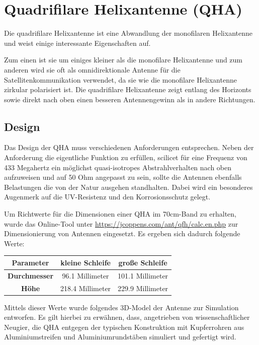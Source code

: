 \chapter{Quadrifilare Helixantenne (QHA)}
\label{chap:qfh}
Die quadrifilare Helixantenne ist eine Abwandlung der monofilaren Helixantenne und weist einige interessante Eigenschaften auf.

Zum einen ist sie um einiges kleiner als die monofilare Helixantenne und zum anderen wird sie oft als omnidirektionale Antenne für die Satellitenkommunikation verwendet, da sie wie die monofilare Helixantenne zirkular polarisiert ist. Die quadrifilare Helixantenne zeigt entlang des Horizonts sowie direkt nach oben einen besseren Antennengewinn als in andere Richtungen.

\section{Design}
Das Design der QHA muss verschiedenen Anforderungen entsprechen. Neben der Anforderung die eigentliche Funktion zu erfüllen, scilicet für eine Frequenz von 433 Megahertz ein möglichst quasi-isotropes Abstrahlverhalten nach oben aufzuweisen und auf 50 Ohm angepasst zu sein, sollte die Antennen ebenfalls Belastungen die von der Natur ausgehen standhalten. Dabei wird ein besonderes Augenmerk auf die UV-Resistenz und den Korrosionsschutz gelegt. 

Um Richtwerte für die Dimensionen einer QHA im 70cm-Band zu erhalten, wurde das Online-Tool unter \url{https://jcoppens.com/ant/qfh/calc.en.php} zur Dimensionierung von Antennen eingesetzt. Es ergeben sich dadurch folgende Werte:

\begin{center}
	\begin{tabular}{|c|c|c|}
		\hline
		\textbf{Parameter} & \textbf{kleine Schleife} & \textbf{große Schleife} \\
		\hline
		\textbf{Durchmesser} & 96.1 Millimeter & 101.1 Millimeter \\
		\hline
		\textbf{Höhe} & 218.4 Millimeter & 229.9 Millimeter \\
		\hline
	\end{tabular}
\end{center}

Mittels dieser Werte wurde folgendes 3D-Model der Antenne zur Simulation entworfen. Es gilt hierbei zu erwähnen, dass, angetrieben von wissenschaftlicher Neugier, die QHA entgegen der typischen Konstruktion mit Kupferrohren aus Aluminiumstreifen und Aluminiumrundstäben simuliert und gefertigt wird. 

